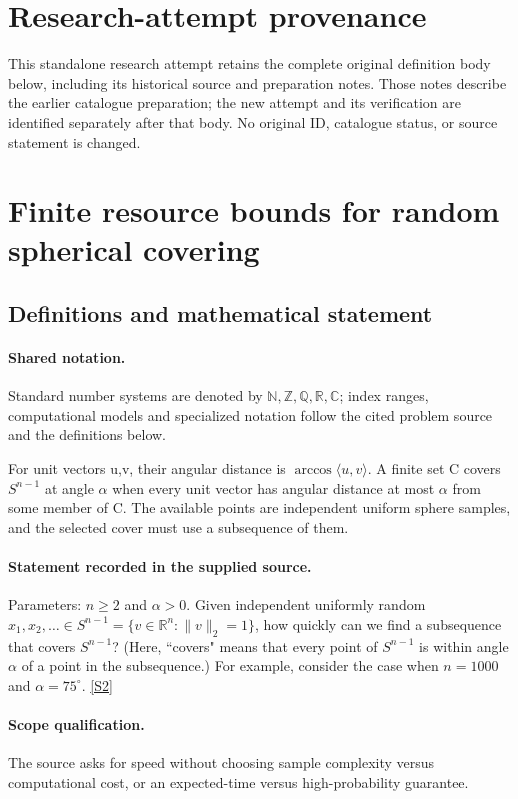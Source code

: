 \documentclass[11pt]{article}
\begin{document}
\section*{Research-attempt provenance}
This standalone research attempt retains the complete original definition body below,
including its historical source and preparation notes. Those notes describe the
earlier catalogue preparation; the new attempt and its verification are identified
separately after that body. No original ID, catalogue status, or source statement is changed.

\section{Finite resource bounds for random spherical covering}\label{statement}

\subsection{Definitions and mathematical statement}

\paragraph{Shared notation.}Standard number systems are denoted by $\mathbb N,\mathbb Z,\mathbb Q,\mathbb R,\mathbb C$; index ranges, computational models and specialized notation follow the cited problem source and the definitions below.


For unit vectors u,v, their angular distance is $\arccos\langle u,v\rangle$. A finite set C covers $S^{n-1}$ at angle $\alpha$ when every unit vector has angular distance at most $\alpha$ from some member of C. The available points are independent uniform sphere samples, and the selected cover must use a subsequence of them.
\paragraph{Statement recorded in the supplied source.}
Parameters: $n \geq 2$ and $\alpha > 0$. Given independent uniformly random $x_1, x_2, \dots\in S^{n-1} = \{v \in \mathbb R^n : \|v\|_2 = 1\}$, how quickly can we find a subsequence that covers $S^{n-1}$? (Here, ``covers" means that every point of $S^{n-1}$ is within angle $\alpha$ of a point in the subsequence.) For example, consider the case when $n = 1000$ and $\alpha = 75^\circ$. \href{http://aimpl.org/quantumalg/6/}{[S2]}
\paragraph{Scope qualification.}
The source asks for speed without choosing sample complexity versus computational cost, or an expected-time versus high-probability guarantee.
\end{document}
